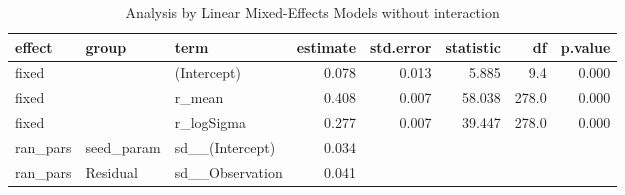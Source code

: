 \begin{table}[ht]
\centering
\caption{Analysis by Linear Mixed-Effects Models without interaction} 
\label{Stbl_lmer2}
\begin{tabular}{lllrrrrr}
  \toprule
effect & group & term & estimate & std.error & statistic & df & p.value \\ 
  \midrule
fixed &  & (Intercept) & 0.078 & 0.013 & 5.885 & 9.4 & 0.000 \\ 
  fixed &  & r\_mean & 0.408 & 0.007 & 58.038 & 278.0 & 0.000 \\ 
  fixed &  & r\_logSigma & 0.277 & 0.007 & 39.447 & 278.0 & 0.000 \\ 
  ran\_pars & seed\_param & sd\_\_(Intercept) & 0.034 &  &  &  &  \\ 
  ran\_pars & Residual & sd\_\_Observation & 0.041 &  &  &  &  \\ 
   \bottomrule
\end{tabular}
\end{table}
